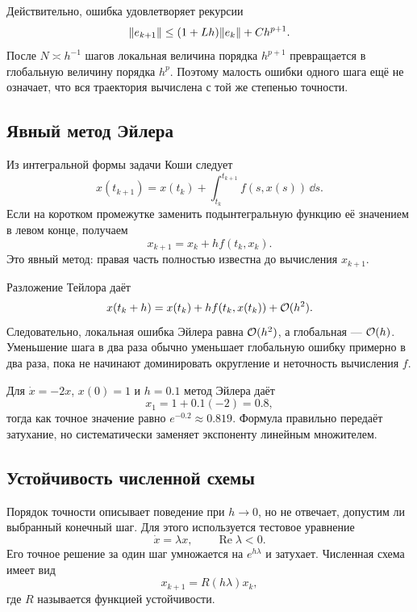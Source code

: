 Действительно, ошибка удовлетворяет рекурсии
\[
\lVert e_{k+1}\rVert
\leq
(1+Lh)\lVert e_k\rVert+Ch^{p+1}.
\]
После $N\asymp h^{-1}$ шагов локальная величина порядка $h^{p+1}$ превращается в глобальную величину порядка $h^p$. Поэтому малость ошибки одного шага ещё не означает, что вся траектория вычислена с той же степенью точности.

\subsection{Явный метод Эйлера}

Из интегральной формы задачи Коши следует
\[
x(t_{k+1})
=
x(t_k)+\int_{t_k}^{t_{k+1}}f(s,x(s))\,\dd s.
\]
Если на коротком промежутке заменить подынтегральную функцию её значением в левом конце, получаем
\begin{equation}
\label{eq:explicit-euler-v04}
x_{k+1}
=
x_k+h f(t_k,x_k).
\end{equation}
Это явный метод: правая часть полностью известна до вычисления $x_{k+1}$.

Разложение Тейлора даёт
\[
x(t_k+h)
=
x(t_k)+h f(t_k,x(t_k))+\mathcal{O}(h^2).
\]
Следовательно, локальная ошибка Эйлера равна $\mathcal{O}(h^2)$, а глобальная --- $\mathcal{O}(h)$. Уменьшение шага в два раза обычно уменьшает глобальную ошибку примерно в два раза, пока не начинают доминировать округление и неточность вычисления $f$.

\begin{example}
Для $\dot x=-2x$, $x(0)=1$ и $h=0.1$ метод Эйлера даёт
\[
x_1=1+0.1(-2)=0.8,
\]
тогда как точное значение равно $e^{-0.2}\approx0.819$. Формула правильно передаёт затухание, но систематически заменяет экспоненту линейным множителем.
\end{example}

\subsection{Устойчивость численной схемы}

Порядок точности описывает поведение при $h\to0$, но не отвечает, допустим ли выбранный конечный шаг. Для этого используется тестовое уравнение
\begin{equation}
\label{eq:linear-test-equation-v04}
\dot x=\lambda x,
\qquad
\operatorname{Re}\lambda<0.
\end{equation}
Его точное решение за один шаг умножается на $e^{h\lambda}$ и затухает. Численная схема имеет вид
\begin{equation}
\label{eq:stability-function-v04}
x_{k+1}=R(h\lambda)x_k,
\end{equation}
где $R$ называется функцией устойчивости.

